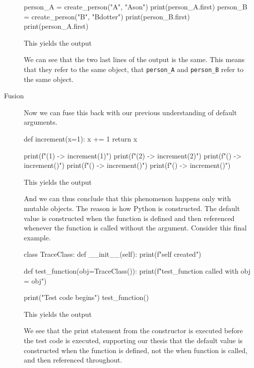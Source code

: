 \begin{description}
\begin{pyblock}[default1][highlightlines={15-16}]
person_A = create_person("A", "Ason")
print(person_A.first)
person_B = create_person("B", "Bdotter")
print(person_B.first)
print(person_A.first)
    \end{pyblock}
    \vspace{0.5em}
    This yields the output
    \vspace{0.5em}
    \printpythontex[verbatim][highlightlines={2-3}]

    We can see that the two last lines of the output is the same.
    This means that they refer to the same object, \ie that 
    \texttt{person_A} and \texttt{person_B} refer to 
    the same object.

  \item[Fusion] Now we can fuse this back with our previous understanding of 
    default arguments.
    \begin{pyblock}[default1]
def increment(x=1):
  x += 1
  return x

print(f"(1) -> {increment(1)}")
print(f"(2) -> {increment(2)}")
print(f"()  -> {increment()}")
print(f"()  -> {increment()}")
print(f"()  -> {increment()}")
    \end{pyblock}
    \vspace{0.5em}
    This yields the output
    \vspace{0.5em}
    \printpythontex[verbatim][highlightlines={3-5}]

    And we can thus conclude that this phenomenon happens only with mutable 
    objects.
    The reason is how Python is constructed.
    The default value is constructed when the function is defined and then 
    referenced whenever the function is called without the argument.
    Consider this final example.

    \begin{pyblock}[default1][highlightlines=3]
class TraceClass:
  def __init__(self):
    print(f"{self} created")

def test_function(obj=TraceClass()):
  print(f"test_function called with obj = {obj}")

print("Test code begins")
test_function()
    \end{pyblock}
    \vspace{0.5em}
    This yields the output
    \vspace{0.5em}
    \printpythontex[verbatim][highlightlines={1}]

    We see that the print statement from the constructor is executed before the 
    test code is executed, supporting our thesis that the default value is 
    constructed when the function is defined, not the when function is called, 
    and then referenced throughout.
\end{description}

